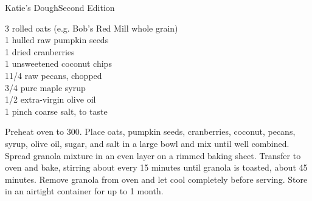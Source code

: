 \begin{entry}{Katie's Dough}{Second Edition}

\begin{open}
 
\end{open}
\begin{ingredients}
    \SI{3}{\cup} rolled oats (e.g. Bob's Red Mill whole grain)\\
    \SI{1}{\cup} hulled raw pumpkin seeds\\
    \SI{1}{\cup} dried cranberries\\
    \SI{1}{\cup} unsweetened coconut chips\\
    1\SI{1/4}{\cup} raw pecans, chopped\\
    \SI{3/4}{\cup} pure maple syrup\\
    \SI{1/2}{\cup} extra-virgin olive oil\\
    1 pinch coarse salt, to taste
\end{ingredients}
Preheat oven to \SI{300}{\degreeF}. Place oats, pumpkin seeds, cranberries,
coconut, pecans, syrup, olive oil, sugar, and salt in a large bowl and mix
until well combined. Spread granola mixture in an even layer on a rimmed
baking sheet. Transfer to oven and bake, stirring about every 15 minutes until
granola is toasted, about 45 minutes. Remove granola from oven and let cool
completely before serving. Store in an airtight container for up to 1 month.
\end{entry}


